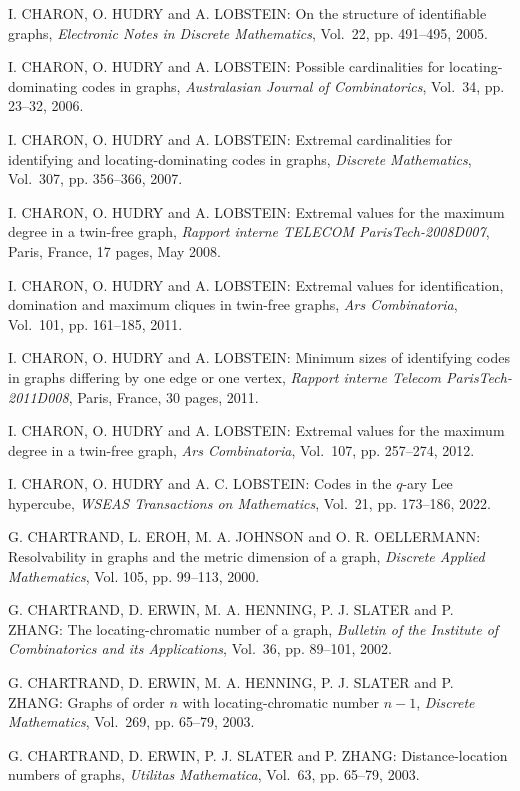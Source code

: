 \begin{thebibliography}{999}
I. CHARON, O. HUDRY and A. LOBSTEIN: On the structure of identifiable graphs, {\it Electronic Notes in Discrete Mathematics}, Vol.~22, pp. 491--495, 2005.

I. CHARON, O. HUDRY and A. LOBSTEIN: Possible cardinalities for locating-dominating codes in graphs, {\it Australasian Journal of Combinatorics}, Vol.~34, pp. 23--32, 2006.

I. CHARON, O. HUDRY and A. LOBSTEIN: Extremal cardinalities for identifying and locating-dominating codes in graphs, {\it Discrete Mathematics}, Vol.~307, pp. 356--366, 2007.

I. CHARON, O. HUDRY and A. LOBSTEIN: Extremal values for the maximum degree in a twin-free graph, {\it Rapport interne TELECOM ParisTech-2008D007}, Paris, France, 17 pages, May 2008.

I. CHARON, O. HUDRY and A. LOBSTEIN: Extremal values for identification, domination and maximum cliques in twin-free graphs, {\it Ars Combinatoria}, Vol.~101, pp. 161--185, 2011.

I. CHARON, O. HUDRY and A. LOBSTEIN: Minimum sizes of identifying codes in graphs differing by one edge or one vertex, {\it Rapport interne Telecom ParisTech-2011D008}, Paris, France, 30 pages, 2011.

I. CHARON, O. HUDRY and A. LOBSTEIN: Extremal values for the maximum degree in a twin-free graph, {\it Ars Combinatoria}, Vol.~107, pp. 257--274, 2012.

I. CHARON, O. HUDRY and A. C. LOBSTEIN: Codes in the $q$-ary Lee hypercube, {\it WSEAS Transactions on Mathematics}, Vol.~21, pp. 173--186, 2022.

G. CHARTRAND, L. EROH, M. A. JOHNSON and O. R. OELLERMANN: Resolvability in graphs and the metric dimension of a graph, {\it Discrete Applied Mathematics}, Vol. 105, pp. 99--113, 2000.

G. CHARTRAND, D. ERWIN, M. A. HENNING, P. J. SLATER and P. ZHANG: The locating-chromatic number of a graph, {\it Bulletin of the Institute of Combinatorics and its Applications}, Vol.~36, pp. 89--101, 2002.

G. CHARTRAND, D. ERWIN, M. A. HENNING, P. J. SLATER and P. ZHANG: Graphs of order $n$ with locating-chromatic number $n-1$, {\it Discrete Mathematics}, Vol.~269, pp. 65--79, 2003.

G. CHARTRAND, D. ERWIN, P. J. SLATER and P. ZHANG: Distance-location numbers of graphs, {\it Utilitas Mathematica}, Vol.~63, pp. 65--79, 2003.


\end{thebibliography}

